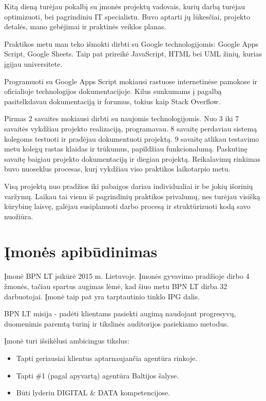\documentclass{VUMIFPSkursinis}
\begin{document}
Kitą dieną turėjau pokalbį su įmonės projektų vadovais, kurių darbą turėjau optimizuoti, bei pagrindiniu IT specialistu. Buvo aptarti jų lūkesčiai, projekto detalės, mano gebėjimai ir praktinės veiklos planas. 

Praktikos metu man teko išmokti dirbti su Google technologijomis: Google Apps Script, Google Sheets. Taip pat prireikė JavaScript, HTML bei UML žinių, kurias įgijau universitete.

Programuoti su Google Apps Script mokiausi rastuose internetinėse pamokose ir oficialioje technologijos dokumentacijoje. Kilus sunkumams į pagalbą pasitelkdavau dokumentaciją ir forumus, tokius kaip Stack Overflow.

Pirmas 2 savaites mokiausi dirbti su naujomis technologijomis. Nuo 3 iki 7 savaitės vykdžiau projekto realizaciją, programavau. 8 savaitę perdaviau sistemą kolegoms testuoti ir pradėjau dokumentuoti projektą. 9 savaitę atlikau testavimo metu kolegų rastas klaidas ir trūkumus, papildžiau funkcionalumą. Paskutinę savaitę baigiau projekto dokumentaciją ir diegiau projektą. Reikalavimų rinkimas buvo nuoseklus procesas, kurį vykdžiau viso praktikos laikotarpio metu.

Visą projektą nuo pradžios iki pabaigos dariau individualiai ir be jokių išorinių varžymų. Laikau tai vienu iš pagrindinių praktikos privalumų, nes turėjau visišką kūrybinę laisvę, galėjau susiplanuoti darbo procesą ir struktūrizuoti kodą savo nuožiūra.



\section {Įmonės apibūdinimas}

Įmonė BPN LT įsikūrė 2015 m. Lietuvoje. Įmonės gyvavimo pradžioje dirbo 4 žmonės, tačiau spartus augimas lėmė, kad šiuo metu BPN LT dirba 32 darbuotojai. Įmonė taip pat yra tarptautinio tinklo IPG dalis. 

BPN LT misija - padėti klientams pasiekti augimą naudojant progresyvų, duomenimis paremtą turinį ir tikslinės auditorijos pasiekiamo metodus. 

Įmonė turi išsikėlusi ambicingus tikslus: 
\begin{itemize}
    \item Tapti geriausiai klientus aptarnaujančia agentūra rinkoje.
    \item Tapti \#1 (pagal apyvartą) agentūra Baltijos šalyse.
    \item Būti lyderiu DIGITAL \& DATA kompetencijose.
\end{itemize}
\bigskip
\end{document}
